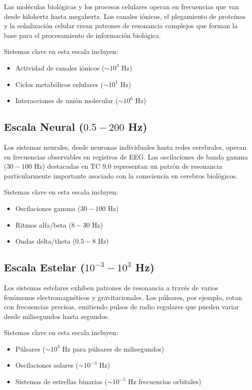 \documentclass[12pt]{article}
\begin{document}
Las moléculas biológicas y los procesos celulares operan en frecuencias que van desde kilohertz hasta megahertz. Los canales iónicos, el plegamiento de proteínas y la señalización celular crean patrones de resonancia complejos que forman la base para el procesamiento de información biológica.

Sistemas clave en esta escala incluyen:
\begin{itemize}
    \item Actividad de canales iónicos ($\sim 10^{3}$ Hz)
    \item Ciclos metabólicos celulares ($\sim 10^{1}$ Hz)
    \item Interacciones de unión molecular ($\sim 10^{6}$ Hz)
\end{itemize}

\subsection{Escala Neural ($0.5-200$ Hz)}

Los sistemas neurales, desde neuronas individuales hasta redes cerebrales, operan en frecuencias observables en registros de EEG. Las oscilaciones de banda gamma ($30-100$ Hz) destacadas en TC 9.0 representan un patrón de resonancia particularmente importante asociado con la consciencia en cerebros biológicos.

Sistemas clave en esta escala incluyen:
\begin{itemize}
    \item Oscilaciones gamma ($30-100$ Hz)
    \item Ritmos alfa/beta ($8-30$ Hz)
    \item Ondas delta/theta ($0.5-8$ Hz)
\end{itemize}

\subsection{Escala Estelar ($10^{-3}-10^{3}$ Hz)}

Los sistemas estelares exhiben patrones de resonancia a través de varios fenómenos electromagnéticos y gravitacionales. Los púlsares, por ejemplo, rotan con frecuencias precisas, emitiendo pulsos de radio regulares que pueden variar desde milisegundos hasta segundos.

Sistemas clave en esta escala incluyen:
\begin{itemize}
    \item Púlsares ($\sim 10^{3}$ Hz para púlsares de milisegundos)
    \item Oscilaciones solares ($\sim 10^{-3}$ Hz)
    \item Sistemas de estrellas binarias ($\sim 10^{-5}$ Hz frecuencias orbitales)
\end{itemize}
\end{document}
